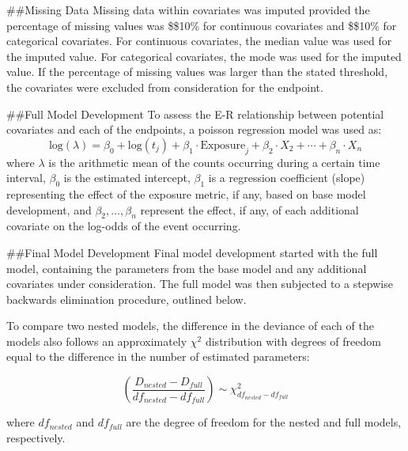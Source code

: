 \documentclass[
]{article}
\begin{document}
\#\#Missing Data Missing data within covariates was imputed provided the
percentage of missing values was \$\le\$10\% for continuous covariates
and \$\le\$10\% for categorical covariates. For continuous covariates,
the median value was used for the imputed value. For categorical
covariates, the mode was used for the imputed value. If the percentage
of missing values was larger than the stated threshold, the covariates
were excluded from consideration for the endpoint.

\#\#Full Model Development To assess the E-R relationship between
potential covariates and each of the endpoints, a poisson regression
model was used as: \begin{equation}
\label{eqn:LRbasecov}
\text{log}(\lambda) = \beta_{0} + \text{log}\left(t_{j}\right) + \beta_1\cdot\text{Exposure}_j + \beta_2\cdot X_2 + \cdots + \beta_n\cdot X_n
\end{equation} where \(\lambda\) is the arithmetic mean of the counts
occurring during a certain time interval, \(\beta_0\) is the estimated
intercept, \(\beta_1\) is a regression coefficient (slope) representing
the effect of the exposure metric, if any, based on base model
development, and \(\beta_2,\ldots,\beta_n\) represent the effect, if
any, of each additional covariate on the log-odds of the event
occurring.

\#\#Final Model Development Final model development started with the
full model, containing the parameters from the base model and any
additional covariates under consideration. The full model was then
subjected to a stepwise backwards elimination procedure, outlined below.

To compare two nested models, the difference in the deviance of each of
the models also follows an approximately \(\chi^2\) distribution with
degrees of freedom equal to the difference in the number of estimated
parameters:

\begin{equation}
\label{eqn:nest}
\left(\frac{D_{nested}-D_{full}}{df_{nested}-df_{full}}\right)\sim\chi^2_{df_{nested}-df_{full}}
\end{equation}

where \(df_{nested}\) and \(df_{full}\) are the degree of freedom for
the nested and full models, respectively.
\end{document}
